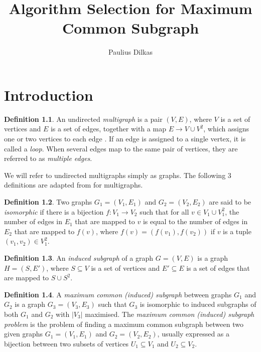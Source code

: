\documentclass{l4proj}
\title{Algorithm Selection for Maximum Common Subgraph}
\author{Paulius Dilkas}
\theoremstyle{definition}
\newtheorem{definition}{Definition}[section]
\theoremstyle{remark}
\begin{document}
\maketitle


\educationalconsent
\tableofcontents

\chapter{Introduction}
\begin{definition}
  An undirected \emph{multigraph} is a pair $(V, E)$, where $V$ is a set of
  vertices and $E$ is a set of edges, together with a map $E \to V \cup V^2$,
  which assigns one or two vertices to each edge
  \cite{DBLP:books/daglib/0030488}. If an edge is assigned to a single vertex,
  it is called a \emph{loop}. When several edges map to the same pair of
  vertices, they are referred to as \emph{multiple edges}. 
\end{definition}

We will refer to undirected multigraphs simply as graphs. The following 3
definitions are adapted from \cite{DBLP:journals/jcamd/RaymondW02a} for
multigraphs.

\begin{definition}
  Two graphs $G_1 = (V_1, E_1)$ and $G_2 = (V_2, E_2)$ are said to be
  \emph{isomorphic} if there is a bijection $f \colon V_1 \to V_2$ such that
  for all $v \in V_1 \cup V_1^2$, the number of edges in $E_1$ that are mapped
  to $v$ is equal to the number of edges in $E_2$ that are mapped to $f(v)$,
  where $f(v) = (f(v_1), f(v_2))$ if $v$ is a tuple $(v_1, v_2) \in V_1^2$.
\end{definition}

\begin{definition} \label{def:induced_subgraph}
  An \emph{induced subgraph} of a graph $G = (V, E)$ is a graph $H = (S, E')$,
  where $S \subseteq V$ is a set of vertices and $E' \subseteq E$ is a set of
  edges that are mapped to $S \cup S^2$.
\end{definition}

\begin{definition}
  A \emph{maximum common (induced) subgraph} between graphs $G_1$ and $G_2$ is a
  graph $G_3 = (V_3, E_3)$ such that $G_3$ is isomorphic to induced subgraphs of
  both $G_1$ and $G_2$ with $|V_3|$ maximised. The \emph{maximum common
    (induced) subgraph problem} is the problem of finding a maximum common
  subgraph between two given graphs $G_1 = (V_1, E_1)$ and $G_2 = (V_2, E_2)$,
  usually expressed as a bijection between two subsets of vertices $U_1
  \subseteq V_1$ and $U_2 \subseteq V_2$.
\end{definition}
\end{document}
